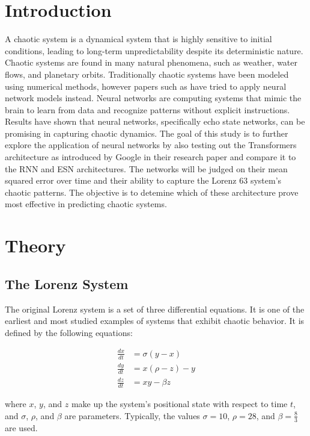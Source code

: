 \documentclass[11pt]{article}
\begin{document}
\section{Introduction}
A chaotic system is a dynamical system that is highly sensitive to initial conditions, leading to long-term unpredictability despite its deterministic nature. Chaotic systems are found in many natural phenomena, such as weather, water flows, and planetary orbits. Traditionally chaotic systems have been modeled using numerical methods, however papers such as \cite{npg-27-373-2020} have tried to apply neural network models instead. Neural networks are computing systems that mimic the brain to learn from data and recognize patterns without explicit instructions. Results have shown that neural networks, specifically echo state networks, can be promising in capturing chaotic dynamics. The goal of this study is to further explore the application of neural networks by also testing out the Transformers architecture as introduced by Google in their research paper \cite{DBLP:journals/corr/VaswaniSPUJGKP17} and compare it to the RNN and ESN architectures. The networks will be judged on their mean squared error over time and their ability to capture the Lorenz 63 system's chaotic patterns. The objective is to detemine which of these architecture prove most effective in predicting chaotic systems.
\section{Theory}

\subsection{The Lorenz System}

The original Lorenz system is a set of three differential equations. It is one of the earliest and most studied examples of systems that exhibit chaotic behavior. It is defined by the following equations:

\begin{align}
\frac{dx}{dt} &= \sigma(y - x) \\
\frac{dy}{dt} &= x(\rho - z) - y \\
\frac{dz}{dt} &= xy - \beta z
\end{align}

where $x$, $y$, and $z$ make up the system's positional state with respect to time $t$, and $\sigma$, $\rho$, and $\beta$ are parameters. Typically, the values $\sigma = 10$, $\rho = 28$, and $\beta = \frac{8}{3}$ are used.
\end{document}
